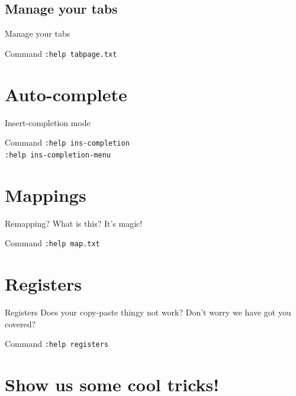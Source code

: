 \documentclass[11pt]{beamer}
\begin{document}
		\subsection{Manage your tabs}

			\begin{frame}{Manage your tabs}
				\begin{block}{Command}
					\texttt{:help tabpage.txt}
				\end{block}
			\end{frame}
	
	\section{Auto-complete}
		
		\begin{frame}{Insert-completion mode}
			\begin{block}{Command}
				\texttt{:help ins-completion} \\
				\texttt{:help ins-completion-menu}
			\end{block}
		\end{frame}

	\section{Mappings}
		
		\begin{frame}{Remapping? What is this?}
			It's magic!
			\begin{block}{Command}
				\texttt{:help map.txt}
			\end{block}
		\end{frame}

	\section{Registers}
	
		\begin{frame}{Registers}
			Does your copy-paste thingy not work? Don't worry we have got you covered?
			\begin{block}{Command}
				\texttt{:help registers}
			\end{block}
		\end{frame}

	\section{Show us some cool tricks!}
\end{document}
